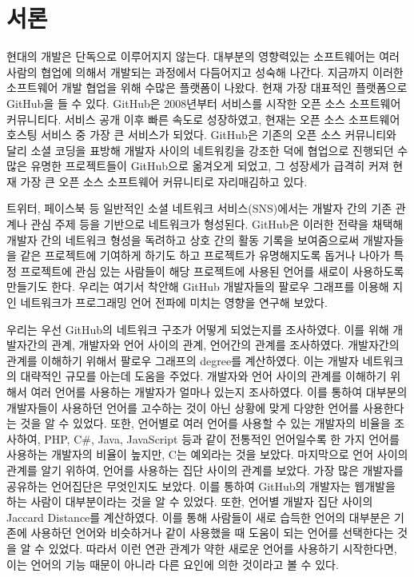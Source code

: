 \documentclass[10pt, a4paper, titlepage]{article}
\begin{document}
\newpage


\section{서론}
현대의 개발은 단독으로 이루어지지 않는다. 대부분의 영향력있는 소프트웨어는 여러 사람의 협업에 의해서 개발되는 과정에서 다듬어지고 성숙해 나간다. 지금까지 이러한 소프트웨어 개발 협업을 위해 수많은 플랫폼이 나왔다. 현재 가장 대표적인 플랫폼으로 GitHub을 들 수 있다. GitHub은 2008년부터 서비스를 시작한 오픈 소스 소프트웨어 커뮤니티다\cite{r1}.
서비스 공개 이후 빠른 속도로 성장하였고, 현재는 오픈 소스 소프트웨어 호스팅 서비스 중 가장 큰 서비스가 되었다. GitHub은 기존의 오픈 소스 커뮤니티와 달리 소셜 코딩을 표방해 개발자 사이의 네트워킹을 강조한 덕에 협업으로 진행되던 수많은 유명한 프로젝트들이 GitHub으로 옮겨오게 되었고, 그 성장세가 급격히 커져 현재 가장 큰 오픈 소스 소프트웨어 커뮤니티로 자리매김하고 있다.


트위터, 페이스북 등 일반적인 소셜 네트워크 서비스(SNS)에서는 개발자 간의 기존 관계나 관심 주제 등을 기반으로 네트워크가 형성된다. GitHub은 이러한 전략을 채택해 개발자 간의 네트워크 형성을 독려하고 상호 간의 활동 기록을 보여줌으로써 개발자들을 같은 프로젝트에 기여하게 하기도 하고 프로젝트가 유명해지도록 돕거나 나아가 특정 프로젝트에 관심 있는 사람들이 해당 프로젝트에 사용된 언어를 새로이 사용하도록 만들기도 한다. 우리는 여기서 착안해 GitHub 개발자들의 팔로우 그래프를 이용해 지인 네트워크가 프로그래밍 언어 전파에 미치는 영향을 연구해 보았다.


우리는 우선 GitHub의 네트워크 구조가 어떻게 되었는지를 조사하였다. 이를 위해 개발자간의 관계, 개발자와 언어 사이의 관계, 언어간의 관계를 조사하였다. 개발자간의 관계를 이해하기 위해서 팔로우 그래프의 degree를 계산하였다. 이는 개발자 네트워크의 대략적인 규모를 아는데 도움을 주었다. 개발자와 언어 사이의 관계를 이해하기 위해서 여러 언어를 사용하는 개발자가 얼마나 있는지 조사하였다. 이를 통하여 대부분의 개발자들이 사용하던 언어를 고수하는 것이 아닌 상황에 맞게 다양한 언어를 사용한다는 것을 알 수 있었다. 또한, 언어별로 여러 언어를 사용할 수 있는 개발자의 비율을 조사하여, PHP, C\#, Java, JavaScript 등과 같이 전통적인 언어일수록 한 가지 언어를 사용하는 개발자의 비율이 높지만, C는 예외라는 것을 보았다. 마지막으로 언어 사이의 관계를 알기 위하여, 언어를 사용하는 집단 사이의 관계를 보았다. 가장 많은 개발자를 공유하는 언어집단은 무엇인지도 보았다. 이를 통하여 GitHub의 개발자는 웹개발을 하는 사람이 대부분이라는 것을 알 수 있었다. 또한, 언어별 개발자 집단 사이의 Jaccard Distance를 계산하였다. 이를 통해 사람들이 새로 습득한 언어의 대부분은 기존에 사용하던 언어와 비슷하거나 같이 사용했을 때 도움이 되는 언어를 선택한다는 것을 알 수 있었다. 따라서 이런 연관 관계가 약한 새로운 언어를 사용하기 시작한다면, 이는 언어의 기능 때문이 아니라 다른 요인에 의한 것이라고 볼 수 있다.
\end{document}
